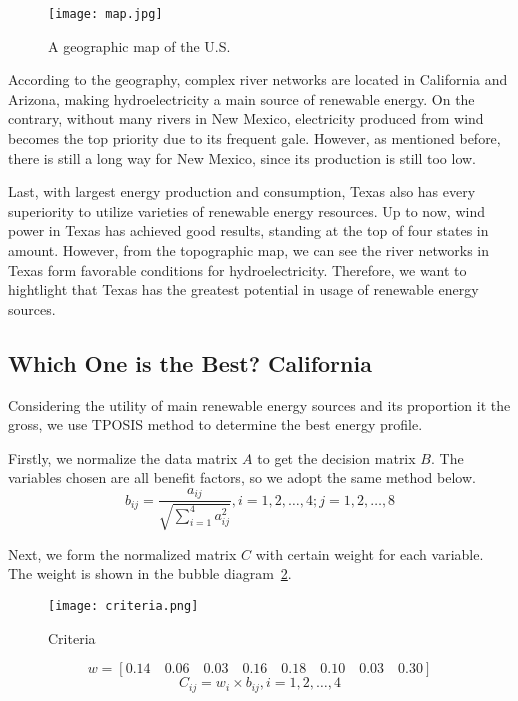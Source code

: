 \documentclass{mcmthesis}
\begin{document}
\begin{figure}[!h]
     \centering
     \texttt{[image: map.jpg]}
     \caption{A geographic map of the U.S.}
     \label{fig:geo}
\end{figure}

According to the geography, complex river networks are located in California and Arizona, making hydroelectricity a main source of renewable energy.
On the contrary, without many rivers in New Mexico, electricity produced from wind becomes the top priority due to its frequent gale.
However, as mentioned before, there is still a long way for New Mexico, since its production is still too low.

Last, with largest energy production and consumption, Texas also has every superiority to utilize varieties of renewable energy resources.
Up to now, wind power in Texas has achieved good results, standing at the top of four states in amount.
However, from the topographic map, we can see the river networks in Texas form favorable conditions for hydroelectricity.
Therefore, we want to hightlight that Texas has the greatest potential in usage of renewable energy sources.


\subsection{Which One is the Best? California}
Considering the utility of main renewable energy sources and its proportion it the gross, we use TPOSIS method to determine the best energy profile.

Firstly, we normalize the data matrix $A$ to get the decision matrix $B$.
The variables chosen are all benefit factors, so we adopt the same method below.
\begin{equation}
b_{ij} = \frac{a_{ij}}{\sqrt{\sum_{i=1}^{4}a_{ij}^2}}, i=1, 2, \dots, 4; j = 1, 2, \dots, 8
\end{equation}

Next, we form the normalized matrix $C$ with certain weight for each variable.
The weight is shown in the bubble diagram~\ref{fig:criteria}.

\begin{figure}[!h]
     \centering
     \texttt{[image: criteria.png]}
     \caption{Criteria}
     \label{fig:criteria}
\end{figure}

\begin{equation}
w  = \left[0.14\quad0.06\quad0.03\quad0.16\quad0.18\quad0.10\quad0.03\quad0.30\right]
\end{equation}
\begin{equation}
C_{ij} = w_i \times b_{ij}, i = 1, 2, \dots, 4
\end{equation}
\end{document}
